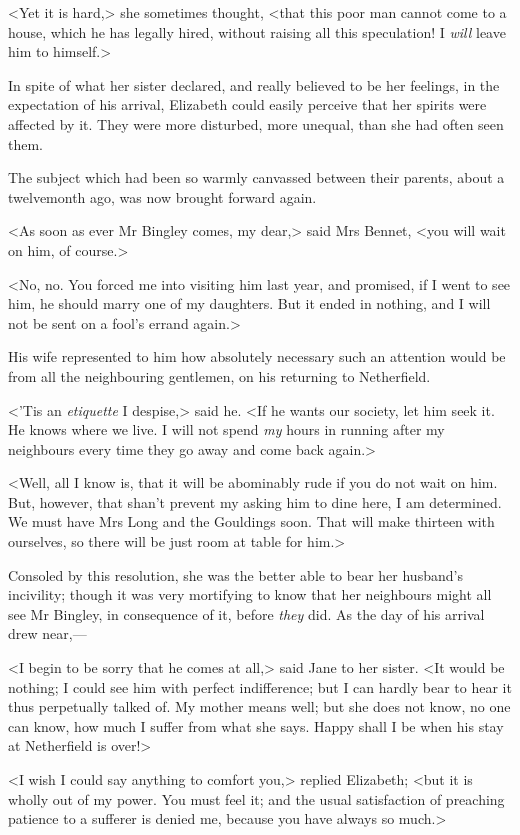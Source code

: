 <Yet it is hard,> she sometimes thought, <that this poor man cannot come to a house, which he has legally hired, without raising all this speculation! I \textit{will} leave him to himself.>

In spite of what her sister declared, and really believed to be her feelings, in the expectation of his arrival, Elizabeth could easily perceive that her spirits were affected by it. They were more disturbed, more unequal, than she had often seen them.

The subject which had been so warmly canvassed between their parents, about a twelvemonth ago, was now brought forward again.

<As soon as ever Mr Bingley comes, my dear,> said Mrs Bennet, <you will wait on him, of course.>

<No, no. You forced me into visiting him last year, and promised, if I went to see him, he should marry one of my daughters. But it ended in nothing, and I will not be sent on a fool's errand again.>

His wife represented to him how absolutely necessary such an attention would be from all the neighbouring gentlemen, on his returning to Netherfield.

<'Tis an \textit{etiquette} I despise,> said he. <If he wants our society, let him seek it. He knows where we live. I will not spend \textit{my} hours in running after my neighbours every time they go away and come back again.>

<Well, all I know is, that it will be abominably rude if you do not wait on him. But, however, that shan't prevent my asking him to dine here, I am determined. We must have Mrs Long and the Gouldings soon. That will make thirteen with ourselves, so there will be just room at table for him.>

Consoled by this resolution, she was the better able to bear her husband's incivility; though it was very mortifying to know that her neighbours might all see Mr Bingley, in consequence of it, before \textit{they} did. As the day of his arrival drew near,—

<I begin to be sorry that he comes at all,> said Jane to her sister. <It would be nothing; I could see him with perfect indifference; but I can hardly bear to hear it thus perpetually talked of. My mother means well; but she does not know, no one can know, how much I suffer from what she says. Happy shall I be when his stay at Netherfield is over!>

<I wish I could say anything to comfort you,> replied Elizabeth; <but it is wholly out of my power. You must feel it; and the usual satisfaction of preaching patience to a sufferer is denied me, because you have always so much.>

